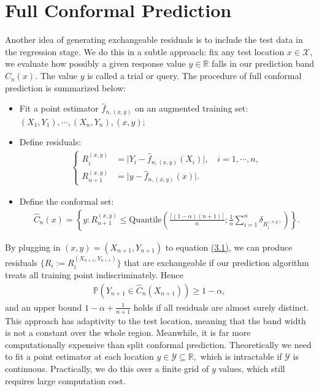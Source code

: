 \documentclass{article}
\numberwithin{equation}{section}
\begin{document}
\section{Full Conformal Prediction}
Another idea of generating exchangeable residuals is to include the test data in the regression stage. We do this in a subtle approach: fix any test location $x\in\mathcal{X}$, we evaluate how possibly a given response value $y\in\mathbb{R}$ falls in our prediction band $\widehat{C}_n(x).$ The value $y$ is called a trial or query. The procedure of full conformal prediction is summarized below:
\begin{itemize}
	\item Fit a point estimator $\widehat{f}_{n,(x,y)}$ on an augmented training set: $(X_1,Y_1),\cdots,(X_n,Y_n),(x,y)$;
	\item Define residuals:
	\begin{align*}
		\begin{cases}
			R^{(x,y)}_{i} &= \vert Y_i - \widehat{f}_{n,(x,y)}(X_i)\vert,\quad i=1,\cdots,n,\\
			R^{(x,y)}_{n+1} &= \vert y - \widehat{f}_{n,(x,y)}(x)\vert.
		\end{cases}\tag{3.1}\label{3.1}
	\end{align*}
    \item Define the conformal set:
    \begin{align*}
    	\widehat{C}_n(x) = \left\{y:R^{(x,y)}_{n+1}\leq \mathrm{Quantile}\left(\frac{\lceil(1-\alpha)(n+1)\rceil}{n};\frac{1}{n}\sum_{i=1}^n\delta_{R_i^{(x,y)}}\right)\right\}.\tag{3.2}\label{3.2}
    \end{align*}
\end{itemize}
By plugging in $(x,y)=(X_{n+1},Y_{n+1})$ to equation \hyperref[3.1]{(3.1)}, we can produce residuals $\{R_i:=R_i^{(X_{n+1},Y_{n+1})}\}$ that are exchangeable if our prediction algorithm treats all training point indiscriminately. Hence
\begin{align*}
	\mathbb{P}\left(Y_{n+1}\in\widehat{C}_n(X_{n+1})\right) \geq 1-\alpha,\tag{3.3}
\end{align*}
and an upper bound $1-\alpha + \frac{1}{n+1}$ holds if all residuals are almost surely distinct. This approach has adaptivity to the test location, meaning that the band width is not a constant over the whole region. Meanwhile, it is far more computationally expensive than split conformal prediction. Theoretically we need to fit a point estimator at each location $y\in\mathcal{Y}\subseteq\mathbb{R},$ which is intractable if $\mathcal{Y}$ is continuous. Practically, we do this over a finite grid of $y$ values, which still requires large computation cost.
\end{document}
